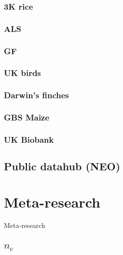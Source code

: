 \documentclass[]{book}
\begin{document}
\hypertarget{k-rice-1}{%
\subsection{3K rice}\label{k-rice-1}}

\hypertarget{als-1}{%
\subsection{ALS}\label{als-1}}

\hypertarget{gf-1}{%
\subsection{GF}\label{gf-1}}

\hypertarget{uk-birds-1}{%
\subsection{UK birds}\label{uk-birds-1}}

\hypertarget{darwins-finches-1}{%
\subsection{Darwin's finches}\label{darwins-finches-1}}

\hypertarget{gbs-maize}{%
\subsection{GBS Maize}\label{gbs-maize}}

\hypertarget{uk-biobank}{%
\subsection{UK Biobank}\label{uk-biobank}}

\hypertarget{public-datahub-neo}{%
\section{Public datahub (NEO)}\label{public-datahub-neo}}

\hypertarget{meta-research}{%
\chapter{Meta-research}\label{meta-research}}

Meta-research

\hypertarget{n_e}{%
\section{\texorpdfstring{\(n_e\)}{n\_e}}\label{n_e}}
\end{document}
